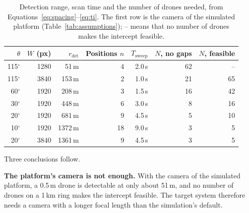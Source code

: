 \begin{table}[H]
\centering
\small
\begin{tabular}{|r|r|r|r|r|r|r|}
\hline
$\theta$ & $W$ (px) & $r_{\mathrm{det}}$ & Positions $n$ & $T_{\mathrm{sweep}}$ & $N$, no gaps & $N$, feasible \\
\hline
115$^\circ$ & 1280 & 51\,m   & 4  & 2.0\,s & 62 & -- \\
115$^\circ$ & 3840 & 153\,m  & 2  & 1.0\,s & 21 & 65 \\
60$^\circ$  & 1920 & 208\,m  & 3  & 1.5\,s & 16 & 42 \\
30$^\circ$  & 1920 & 448\,m  & 6  & 3.0\,s & 8  & 16 \\
20$^\circ$  & 1920 & 681\,m  & 9  & 4.5\,s & 5  & 10 \\
10$^\circ$  & 1920 & 1372\,m & 18 & 9.0\,s & 3  & 5 \\
20$^\circ$  & 3840 & 1361\,m & 9  & 4.5\,s & 3  & 5 \\
\hline
\end{tabular}
\caption{Detection range, scan time and the number of drones needed, from
Equations~\eqref{eq:spacing}--\eqref{eq:ti}. The first row is the camera of
the simulated platform (Table~\ref{tab:assumptions}); -- means that no number
of drones makes the intercept feasible.}
\label{tab:coverage}
\end{table}

Three conclusions follow.

\textbf{The platform's camera is not enough.} With the camera of the simulated
platform, a 0.5\,m drone is detectable at only about 51\,m, and no number of
drones on a 1\,km ring makes the intercept feasible. The target system
therefore needs a camera with a longer focal length than the simulation's
default.

